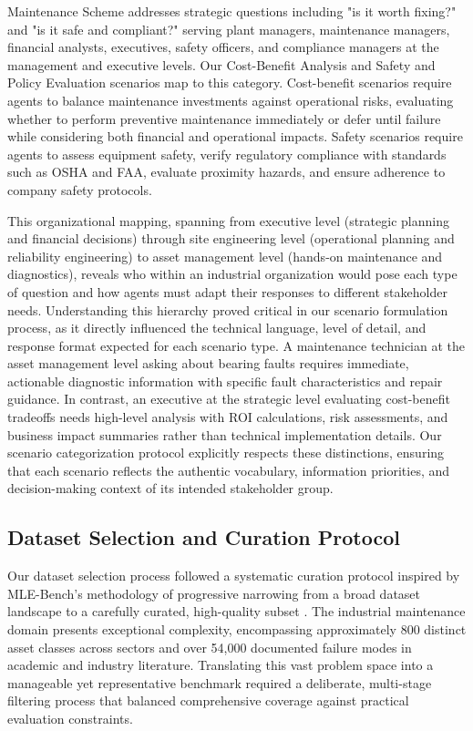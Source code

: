 \documentclass[conference]{IEEEtran}
\begin{document}
Maintenance Scheme addresses strategic questions including "is it worth fixing?" and "is it safe and compliant?" serving plant managers, maintenance managers, financial analysts, executives, safety officers, and compliance managers at the management and executive levels. Our Cost-Benefit Analysis and Safety and Policy Evaluation scenarios map to this category. Cost-benefit scenarios require agents to balance maintenance investments against operational risks, evaluating whether to perform preventive maintenance immediately or defer until failure while considering both financial and operational impacts. Safety scenarios require agents to assess equipment safety, verify regulatory compliance with standards such as OSHA and FAA, evaluate proximity hazards, and ensure adherence to company safety protocols.

This organizational mapping, spanning from executive level (strategic planning and financial decisions) through site engineering level (operational planning and reliability engineering) to asset management level (hands-on maintenance and diagnostics), reveals who within an industrial organization would pose each type of question and how agents must adapt their responses to different stakeholder needs. Understanding this hierarchy proved critical in our scenario formulation process, as it directly influenced the technical language, level of detail, and response format expected for each scenario type. A maintenance technician at the asset management level asking about bearing faults requires immediate, actionable diagnostic information with specific fault characteristics and repair guidance. In contrast, an executive at the strategic level evaluating cost-benefit tradeoffs needs high-level analysis with ROI calculations, risk assessments, and business impact summaries rather than technical implementation details. Our scenario categorization protocol explicitly respects these distinctions, ensuring that each scenario reflects the authentic vocabulary, information priorities, and decision-making context of its intended stakeholder group.

\subsection{Dataset Selection and Curation Protocol}

Our dataset selection process followed a systematic curation protocol inspired by MLE-Bench's methodology of progressive narrowing from a broad dataset landscape to a carefully curated, high-quality subset \cite{patil2024mlebench}. The industrial maintenance domain presents exceptional complexity, encompassing approximately 800 distinct asset classes across sectors and over 54,000 documented failure modes in academic and industry literature. Translating this vast problem space into a manageable yet representative benchmark required a deliberate, multi-stage filtering process that balanced comprehensive coverage against practical evaluation constraints.
\end{document}
